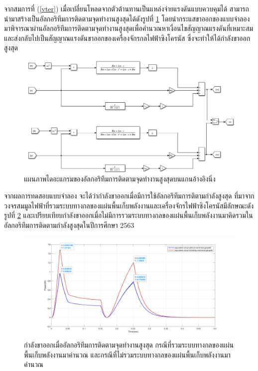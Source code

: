 \documentclass[11pt,a4paper]{article}
\begin{document}
จากสมการที่ (\ref{vter}) เมื่อเปลี่ยนโหลดจากตัวต้านทานเป็นแหล่งจ่ายแรงดันแบบควบคุมได้ สามารถนำมาสร้างเป็นอัลกอริทึมการติดตามจุดทำงานสูงสุดได้ดังรูปที่ \ref{mppt_v}
โดยนำกระแสขาออกของแบบจำลองมาพิจารณาผ่านอัลกอริทึมการติดตามจุดทำงานสูงสุดเพื่อคำนวณหาเงื่อนไขสัญญาณแรงดันที่เหมาะสมและส่งกลับไปเป็นสัญญาณแรงดันขาออกของเครื่องจักรกลไฟฟ้าซิงโครนัส ซึ่งจะทำให้ได้กำลังขาออกสูงสุด
\begin{figure}[H]
    \begin{center}
        \includegraphics[width=1\textwidth]{mppt_v.png}
    \end{center}
    \caption{แผนภาพไดอะแกรมของอัลกอริทึมการติดตามจุดทำงานสูงสุดบนแกนอ้างอิงนิ่ง}
    \label{mppt_v}
\end{figure}

จากผลการทดสอบแบบจำลอง จะได้ว่ากำลังขาออกเมื่อมีการใช้อัลกอริทึมการติตามกำลังสูงสุด ที่มาจากวงจรสมมูลไฟฟ้าที่รวมระบบทางกลของแผ่นพื้นเก็บพลังงานและเครื่องจักรไฟฟ้าซิงโครนัสมีลักษณะดังรูปที่ \ref{mppt_graph}
และเปรียบเทียบกำลังขาออกเมื่อไม่มีการรวมระบบทางกลของแผ่นพื้นเก็บพลังงานมาคิดรวมในอัลกอริทึมการติดตามกำลังสูงสุดในปีการศึกษา 2563

\begin{figure}[H]
    \begin{center}
        \includegraphics[width=1\textwidth]{mppt_graph.jpg}
    \end{center}
    \caption{กำลังขาออกเมื่ออัลกอริทึมการติดตามจุดทำงานสูงสุด กรณีที่รวมระบบทางกลของแผ่นพื้นเก็บพลังงานมาคำนวณ และกรณีที่ไม่รวมระบบทางกลของแผ่นพื้นเก็บพลังงานมาคำนวณ}
    \label{mppt_graph}
\end{figure}
\end{document}
